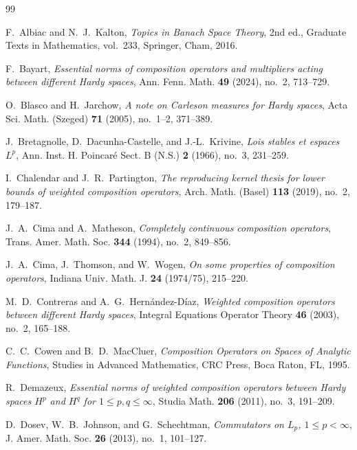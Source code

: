 \documentclass[11pt, reqno]{amsart}
\theoremstyle{definition}
\theoremstyle{remark}
\begin{document}
\begin{thebibliography}{99}

F.~Albiac and N.~J.~Kalton,
\textit{Topics in Banach Space Theory},
2nd ed., Graduate Texts in Mathematics, vol.~233,
Springer, Cham, 2016.

F.~Bayart,
\textit{Essential norms of composition operators and multipliers acting
between different Hardy spaces},
Ann. Fenn. Math. \textbf{49} (2024), no.~2, 713--729.

O.~Blasco and H.~Jarchow,
\textit{A note on Carleson measures for Hardy spaces},
Acta Sci. Math. (Szeged) \textbf{71} (2005), no.~1--2, 371--389.

J.~Bretagnolle, D.~Dacunha-Castelle, and J.-L.~Krivine,
\textit{Lois stables et espaces \(L^p\)},
Ann. Inst. H. Poincar\'e Sect. B (N.S.) \textbf{2} (1966),
no.~3, 231--259.

I.~Chalendar and J.~R.~Partington,
\textit{The reproducing kernel thesis for lower bounds of weighted
composition operators},
Arch. Math. (Basel) \textbf{113} (2019), no.~2, 179--187.

J.~A.~Cima and A.~Matheson,
\textit{Completely continuous composition operators},
Trans. Amer. Math. Soc. \textbf{344} (1994), no.~2, 849--856.

J.~A.~Cima, J.~Thomson, and W.~Wogen,
\textit{On some properties of composition operators},
Indiana Univ. Math. J. \textbf{24} (1974/75), 215--220.

M.~D.~Contreras and A.~G.~Hern\'andez-D\'iaz,
\textit{Weighted composition operators between different Hardy spaces},
Integral Equations Operator Theory \textbf{46} (2003),
no.~2, 165--188.

C.~C.~Cowen and B.~D.~MacCluer,
\textit{Composition Operators on Spaces of Analytic Functions},
Studies in Advanced Mathematics,
CRC Press, Boca Raton, FL, 1995.

R.~Demazeux,
\textit{Essential norms of weighted composition operators between
Hardy spaces \(H^p\) and \(H^q\) for \(1\le p,q\le\infty\)},
Studia Math. \textbf{206} (2011), no.~3, 191--209.

D.~Dosev, W.~B.~Johnson, and G.~Schechtman,
\textit{Commutators on \(L_p\), \(1\le p<\infty\)},
J. Amer. Math. Soc. \textbf{26} (2013), no.~1, 101--127.


\end{thebibliography}
\end{document}
